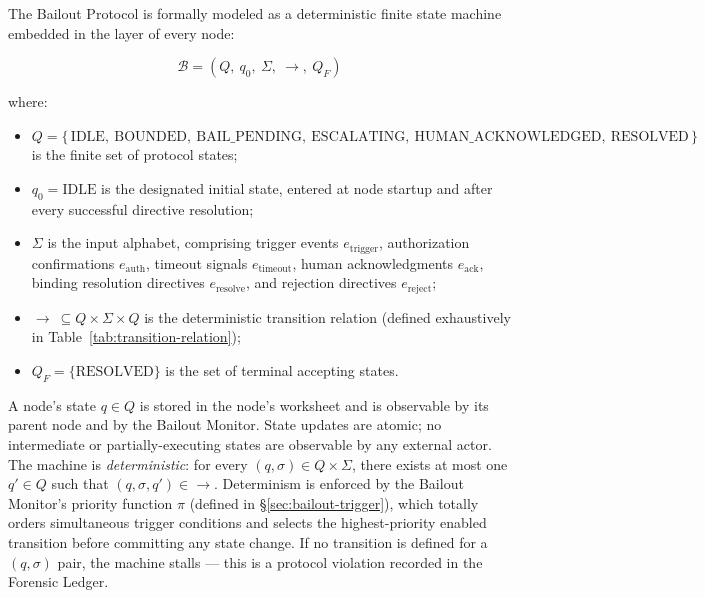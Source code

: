 The Bailout Protocol is formally modeled as a deterministic finite state machine embedded in the \fact{} layer of every \bxthree{} node:

\[
\mathcal{B} = (Q,\ q_0,\ \Sigma,\ \rightarrow,\ Q_F)
\]

where:

\begin{itemize}\itemsep0em
\item $Q = \{\,\text{IDLE},\ \text{BOUNDED},\ \text{BAIL\_PENDING},\ \text{ESCALATING},\ \text{HUMAN\_ACKNOWLEDGED},\ \text{RESOLVED}\,\}$ is the finite set of protocol states;
\item $q_0 = \text{IDLE}$ is the designated initial state, entered at node startup and after every successful directive resolution;
\item $\Sigma$ is the input alphabet, comprising trigger events $e_{\text{trigger}}$, authorization confirmations $e_{\text{auth}}$, timeout signals $e_{\text{timeout}}$, human acknowledgments $e_{\text{ack}}$, binding resolution directives $e_{\text{resolve}}$, and rejection directives $e_{\text{reject}}$;
\item $\rightarrow\ \subseteq Q \times \Sigma \times Q$ is the deterministic transition relation (defined exhaustively in Table~\ref{tab:transition-relation});
\item $Q_F = \{\text{RESOLVED}\}$ is the set of terminal accepting states.
\end{itemize}

A node's state $q \in Q$ is stored in the node's worksheet and is observable by its parent node and by the Bailout Monitor. State updates are atomic; no intermediate or partially-executing states are observable by any external actor. The machine is \emph{deterministic}: for every $(q, \sigma) \in Q \times \Sigma$, there exists at most one $q' \in Q$ such that $(q, \sigma, q') \in \rightarrow$. Determinism is enforced by the Bailout Monitor's priority function $\pi$ (defined in \S\ref{sec:bailout-trigger}), which totally orders simultaneous trigger conditions and selects the highest-priority enabled transition before committing any state change. If no transition is defined for a $(q, \sigma)$ pair, the machine stalls — this is a protocol violation recorded in the Forensic Ledger.

